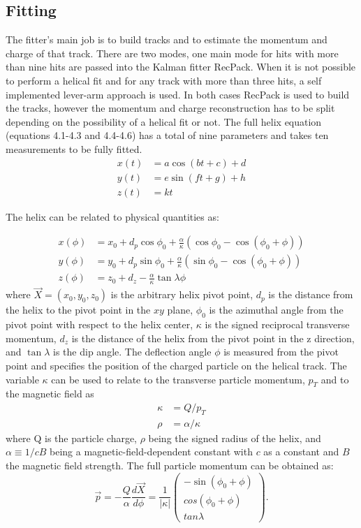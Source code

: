 \subsection{Fitting}
The fitter's main job is to build tracks and to estimate the momentum and charge of that track. There are two modes, one main mode for hits with more than nine hits are passed into the Kalman fitter RecPack. When it is not possible to perform a helical fit and for any track with more than three hits, a self implemented lever-arm approach is used. In both cases RecPack is used to build the tracks, however the momentum and charge reconstruction has to be split depending on the possibility of a helical fit or not. The full helix equation (equations 4.1-4.3 and 4.4-4.6) has a total of nine parameters and takes ten measurements to be fully fitted.  
\begin{align}
x(t) &= a\cos(bt+c)+d\\
y(t) &= e\sin(ft+g) + h\\
z(t) &= kt
\end{align}

The helix can be related to physical quantities as:

\begin{align}
x(\phi) &= x_0 + d_p \cos \phi_0 + \frac{\alpha}{\kappa}(\cos \phi_0 - \cos(\phi_0 + \phi))\\ 
y(\phi) &= y_0 + d_p \sin \phi_0 + \frac{\alpha}{\kappa}(\sin \phi_0 - \cos(\phi_0 + \phi))\\
z(\phi) &= z_0 + d_z - \frac{\alpha}{\kappa} \tan \lambda \phi
\end{align}
where $\vec{X} = (x_0, y_0, z_0)$ is the arbitrary helix pivot point, $d_p$ is the distance from the helix to the pivot point in the $xy$ plane, $\phi_0$ is the azimuthal angle from the pivot point with respect to the helix center, $\kappa$ is the signed reciprocal transverse momentum, $d_z$ is the distance of the helix from the pivot point in the z direction, and $\tan\lambda$ is the dip angle. The deflection angle $\phi$ is measured from the pivot point and specifies the position of the charged particle on the helical track. The variable $\kappa$ can be used to relate to the transverse particle momentum, $p_T$ and to the magnetic field as 
\begin{align}
 \kappa &=  Q/p_T \\  
 \rho &=  \alpha/\kappa
 \end{align}
where Q is the particle charge, $\rho$ being the signed radius of the helix, and $\alpha \equiv 1/c B$ being a magnetic-field-dependent constant with $c$ as a constant and $B$ the magnetic field strength. The full particle momentum can be obtained as: 
\begin{equation}
\vec{p} = - \frac{Q}{\alpha} \frac{d\vec{X}}{d\phi} = \frac{1}{|\kappa |} 
 \begin{pmatrix}
 -\sin(\phi_0 + \phi)\\
 cos(\phi_0 + \phi)\\
 tan\lambda
 \end{pmatrix}.
\end{equation}

